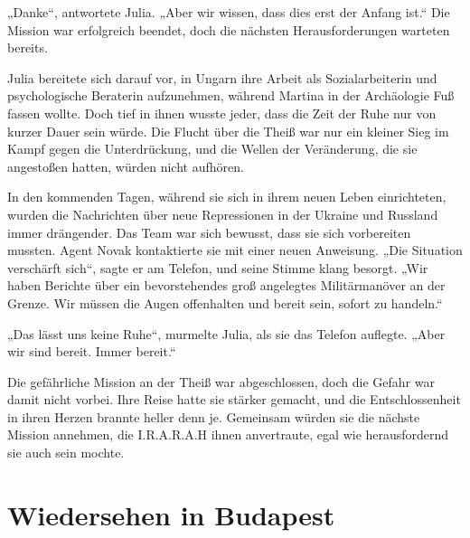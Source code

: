 \documentclass[
]{article}
\begin{document}
„Danke``, antwortete Julia. „Aber wir wissen, dass dies erst der Anfang
ist.`` Die Mission war erfolgreich beendet, doch die nächsten
Herausforderungen warteten bereits.

Julia bereitete sich darauf vor, in Ungarn ihre Arbeit als
Sozialarbeiterin und psychologische Beraterin aufzunehmen, während
Martina in der Archäologie Fuß fassen wollte. Doch tief in ihnen wusste
jeder, dass die Zeit der Ruhe nur von kurzer Dauer sein würde. Die
Flucht über die Theiß war nur ein kleiner Sieg im Kampf gegen die
Unterdrückung, und die Wellen der Veränderung, die sie angestoßen
hatten, würden nicht aufhören.

In den kommenden Tagen, während sie sich in ihrem neuen Leben
einrichteten, wurden die Nachrichten über neue Repressionen in der
Ukraine und Russland immer drängender. Das Team war sich bewusst, dass
sie sich vorbereiten mussten. Agent Novak kontaktierte sie mit einer
neuen Anweisung. „Die Situation verschärft sich``, sagte er am Telefon,
und seine Stimme klang besorgt. „Wir haben Berichte über ein
bevorstehendes groß angelegtes Militärmanöver an der Grenze. Wir müssen
die Augen offenhalten und bereit sein, sofort zu handeln.``

„Das lässt uns keine Ruhe``, murmelte Julia, als sie das Telefon
auflegte. „Aber wir sind bereit. Immer bereit.``

Die gefährliche Mission an der Theiß war abgeschlossen, doch die Gefahr
war damit nicht vorbei. Ihre Reise hatte sie stärker gemacht, und die
Entschlossenheit in ihren Herzen brannte heller denn je. Gemeinsam
würden sie die nächste Mission annehmen, die I.R.A.R.A.H ihnen
anvertraute, egal wie herausfordernd sie auch sein mochte.

\section{Wiedersehen in Budapest}\label{wiedersehen-in-budapest}
\end{document}

